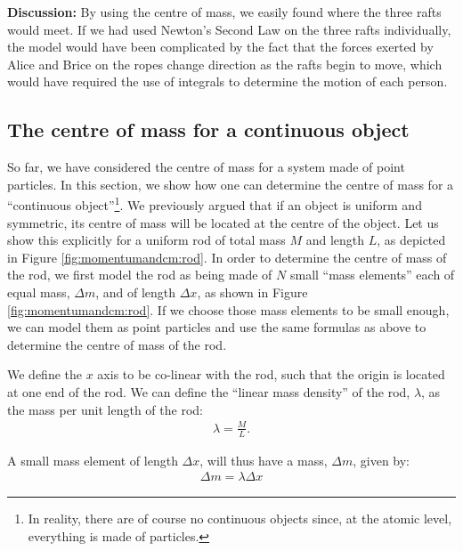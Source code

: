 \begin{example}
\textbf{Discussion: }By using the centre of mass, we easily found where the three rafts would meet. If we had used Newton's Second Law on the three rafts individually, the model would have been complicated by the fact that the forces exerted by Alice and Brice on the ropes change direction as the rafts begin to move, which would have required the use of integrals to determine the motion of each person.
\end{example}


\subsection{The centre of mass for a continuous object}
So far, we have considered the centre of mass for a system made of point particles. In this section, we show how one can determine the centre of mass for a ``continuous object''\footnote{In reality, there are of course no continuous objects since, at the atomic level, everything is made of particles.}. We previously argued that if an object is uniform and symmetric, its centre of mass will be located at the centre of the object. Let us show this explicitly for a uniform rod of total mass $M$ and length $L$, as depicted in Figure \ref{fig:momentumandcm:rod}.
In order to determine the centre of mass of the rod, we first model the rod as being made of $N$ small ``mass elements'' each of equal mass, $\Delta m$, and of length $\Delta x$, as shown in Figure \ref{fig:momentumandcm:rod}. If we choose those mass elements to be small enough, we can model them as point particles and use the same formulas as above to determine the centre of mass of the rod.

We define the $x$ axis to be co-linear with the rod, such that the origin is located at one end of the rod. We can define the ``linear mass density'' of the rod, $\lambda$, as the mass per unit length of the rod:
\begin{align*}
\lambda = \frac{M}{L}.
\end{align*}

A small mass element of length $\Delta x$, will thus have a mass, $\Delta m$, given by:
\begin{align*}
\Delta m = \lambda \Delta x 
\end{align*}

